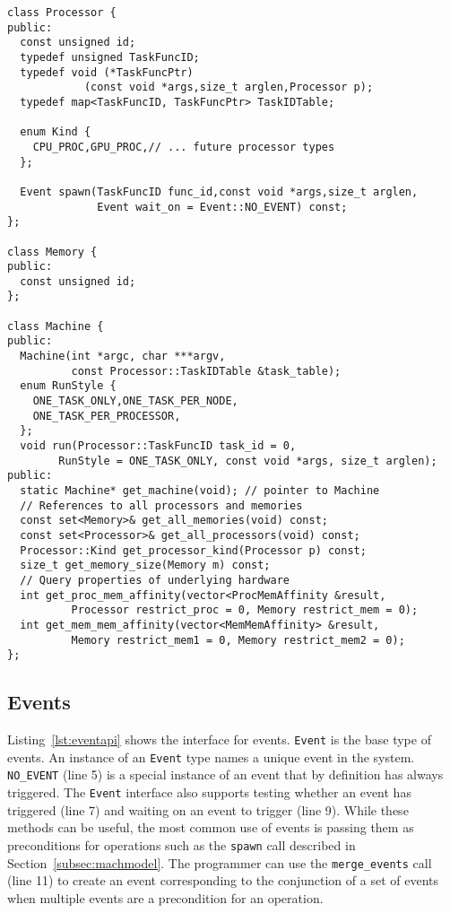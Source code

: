 \begin{lstlisting}[float={t},label={lst:machineapi},caption={Machine Interface.}]
class Processor {
public:
  const unsigned id;
  typedef unsigned TaskFuncID;
  typedef void (*TaskFuncPtr)
            (const void *args,size_t arglen,Processor p);
  typedef map<TaskFuncID, TaskFuncPtr> TaskIDTable;

  enum Kind {
    CPU_PROC,GPU_PROC,// ... future processor types
  };

  Event spawn(TaskFuncID func_id,const void *args,size_t arglen,
              Event wait_on = Event::NO_EVENT) const;
};

class Memory {
public:
  const unsigned id;
};

class Machine {
public:
  Machine(int *argc, char ***argv,
          const Processor::TaskIDTable &task_table);
  enum RunStyle {
    ONE_TASK_ONLY,ONE_TASK_PER_NODE,
    ONE_TASK_PER_PROCESSOR,
  };
  void run(Processor::TaskFuncID task_id = 0, 
        RunStyle = ONE_TASK_ONLY, const void *args, size_t arglen);
public:
  static Machine* get_machine(void); // pointer to Machine
  // References to all processors and memories
  const set<Memory>& get_all_memories(void) const;
  const set<Processor>& get_all_processors(void) const;
  Processor::Kind get_processor_kind(Processor p) const;
  size_t get_memory_size(Memory m) const;
  // Query properties of underlying hardware
  int get_proc_mem_affinity(vector<ProcMemAffinity &result,
          Processor restrict_proc = 0, Memory restrict_mem = 0);
  int get_mem_mem_affinity(vector<MemMemAffinity> &result,
          Memory restrict_mem1 = 0, Memory restrict_mem2 = 0);
};
\end{lstlisting}


\subsection{Events}
\label{subsec:events}
Listing~\ref{lst:eventapi} shows the interface for events.  
{\tt Event} is the base type of events.  An instance of an {\tt Event} type 
names a unique event in the system.  {\tt NO\_EVENT} (line 5) is a special instance
of an event that by definition has always triggered.  The {\tt Event} interface
also supports testing whether an event has triggered (line 7) and waiting on
an event to trigger (line 9).  While these methods can be useful, the most common
use of events is passing them as preconditions for operations such as the {\tt spawn}
call described in Section~\ref{subsec:machmodel}.  The programmer can use the
{\tt merge\_events} call (line 11) to create an event corresponding to the 
conjunction of a set of events when multiple events are a precondition for an operation.

